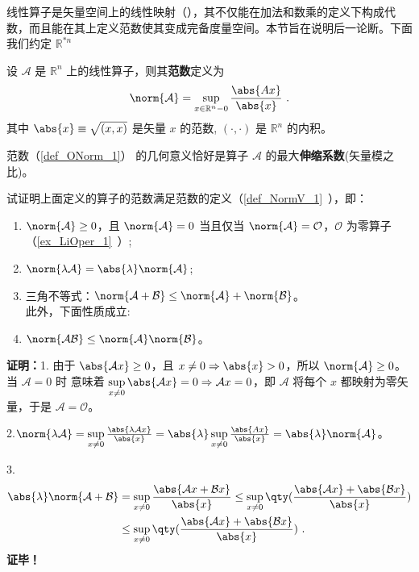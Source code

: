 线性算子是矢量空间上的线性映射（），其不仅能在加法和数乘的定义下构成代数，而且能在其上定义范数使其变成完备度量空间。本节旨在说明后一论断。下面我们约定 $\mathbb R^{*n}$
\begin{definition}{}\label{def_ONorm_1}
设 $\mathcal A$ 是 $\mathbb R^n$ 上的线性算子，则其\textbf{范数}定义为
\begin{equation}\label{eq_ONorm_1}
\norm{\mathcal A}=\sup_{x\in{\mathbb R^n-0}}\frac{\abs{Ax}}{\abs{x}}~.
\end{equation}
其中 $\abs{x}\equiv\sqrt{(x,x)}$ 是矢量 $x$ 的范数, $(\cdot,\cdot)$ 是 $\mathbb R^n$ 的内积。
\end{definition}
范数（\autoref{def_ONorm_1}） 的几何意义恰好是算子 $\mathcal A$ 的最大\textbf{伸缩系数}(矢量模之比)。
\begin{example}{}
试证明上面定义的算子的范数满足范数的定义（\autoref{def_NormV_1}~），即：
\begin{enumerate}
\item $\norm{\mathcal A}\geq0$，且 $\norm{\mathcal A}=0$ 当且仅当 $\norm{\mathcal A}=\mathcal O$，$\mathcal O$ 为零算子（\autoref{ex_LiOper_1}~）;
\item $\norm{\lambda \mathcal A}=\abs{\lambda}\norm{\mathcal A}$;
\item 三角不等式：$\norm{\mathcal A+\mathcal B}\leq\norm{\mathcal A}+\norm{\mathcal B}$。\\
此外，下面性质成立:\\
\item $\norm{\mathcal{AB}}\leq{\norm{\mathcal A}}\norm{\mathcal B}$。
\end{enumerate}
\end{example}
\textbf{证明：}1. 由于 $\abs{\mathcal A x}\geq0$，且 $x\neq0\Rightarrow\abs{x}>0$，所以
$\norm{\mathcal A}\geq0$。当 $\mathcal A=0$ 时 意味着 $\sup\limits_{x\neq0}\abs{\mathcal A x}=0\Rightarrow\mathcal A x=0$，即 $\mathcal A$ 将每个 $x$ 都映射为零矢量，于是 $\mathcal A=\mathcal O$。

2.$\norm{\lambda\mathcal A}=\sup\limits_{x\neq0}\frac{\abs{\lambda \mathcal Ax}}{\abs{x}}=\abs{\lambda}\sup\limits_{x\neq0}\frac{\abs{Ax}}{\abs{x}}=\abs{\lambda}\norm{\mathcal A}
$。

3.\begin{equation}
\begin{aligned}
\abs{\lambda}\norm{\mathcal A+\mathcal B}&=\sup\limits_{x\neq0}\frac{\abs{\mathcal Ax+\mathcal B x}}{\abs{x}}\leq\sup\limits_{x\neq0}\qty(\frac{\abs{\mathcal Ax}+\abs{\mathcal B x}}{\abs{x}})\\
&\leq \sup\limits_{x\neq0}\qty(\frac{\abs{ \mathcal Ax}+\abs{\mathcal B x}}{\abs{x}})~.
\end{aligned}
\end{equation}
\textbf{证毕！}
